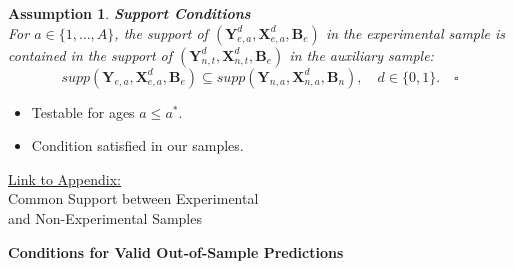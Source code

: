 \documentclass[static]{JJH-Beamer}
\newtheorem{assumption}{Assumption}
\begin{document}
\begin{frame}

\begin{assumption} \label{ass:contain} \textbf{Support Conditions} \\
For $a \in \{ 1, \ldots, A \}$, the support of $\left( \bm{Y}^d_{e,a}, \bm{X}^d_{e,a}, \bm{B}_e \right)$ in the experimental sample is contained in the support of $\left( \bm{Y}^d_{n,t}, \bm{X}^d_{n,t}, \bm{B}_e \right)$ in the auxiliary sample:
\begin{equation}
supp( \bm{Y}_{e,a}, \bm{X}^d_{e,a}, \bm{B}_e ) \subseteq supp( \bm{Y}_{n,a}, \bm{X}^d_{n,a}, \bm{B}_n ), \quad d \in \{0,1\}. \quad \square
\end{equation}
\end{assumption}

\begin{itemize}
\item Testable for ages $a\leq a^\ast$.
\item Condition satisfied in our samples.
\end{itemize}

\end{frame}

\begin{frame}

\hypertarget{ret:doughnut}{}
\begin{center}
\hyperlink{doughnut}{\underline{Link to Appendix:}}\\
Common Support between Experimental\\ and Non-Experimental Samples
\end{center}

\end{frame}

\begin{frame}

\begin{center}
\textbf{Conditions for Valid Out-of-Sample Predictions}
\end{center}

\end{frame}
\end{document}
